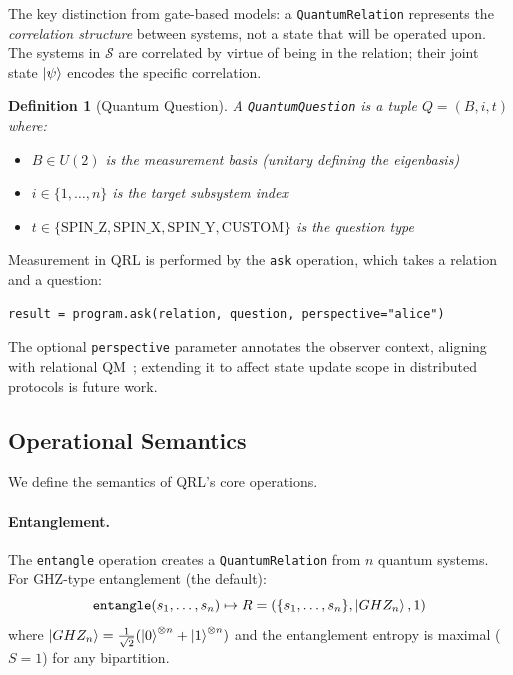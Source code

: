 \documentclass[submission,copyright,creativecommons]{eptcs}
\newtheorem{definition}{Definition}
\newcommand{\qrl}{\textsc{QRL}}
\begin{document}
The key distinction from gate-based models: a \texttt{QuantumRelation} represents
the \emph{correlation structure} between systems, not a state that will be
operated upon. The systems in $\mathcal{S}$ are correlated by virtue of being
in the relation; their joint state $\ket{\psi}$ encodes the specific correlation.

\begin{definition}[Quantum Question]
A \texttt{QuantumQuestion} is a tuple $Q = (B, i, t)$ where:
\begin{itemize}
    \item $B \in U(2)$ is the measurement basis (unitary defining the eigenbasis)
    \item $i \in \{1, \ldots, n\}$ is the target subsystem index
    \item $t \in \{\text{SPIN\_Z}, \text{SPIN\_X}, \text{SPIN\_Y}, \text{CUSTOM}\}$
          is the question type
\end{itemize}
\end{definition}

Measurement in \qrl{} is performed by the \texttt{ask} operation, which takes
a relation and a question:

\begin{lstlisting}
result = program.ask(relation, question, perspective="alice")
\end{lstlisting}

The optional \texttt{perspective} parameter annotates the observer
context, aligning with relational QM~\cite{rovelli1996}; extending it
to affect state update scope in distributed protocols is future work.

\subsection{Operational Semantics}

We define the semantics of \qrl{}'s core operations.

\paragraph{Entanglement.}
The \texttt{entangle} operation creates a \texttt{QuantumRelation} from $n$
quantum systems. For GHZ-type entanglement (the default):
\begin{equation}
\texttt{entangle}(s_1, \ldots, s_n) \mapsto R = (\{s_1, \ldots, s_n\}, \ket{GHZ_n}, 1)
\end{equation}
where $\ket{GHZ_n} = \frac{1}{\sqrt{2}}(\ket{0}^{\otimes n} + \ket{1}^{\otimes n})$
and the entanglement entropy is maximal ($S = 1$) for any bipartition.
\end{document}
